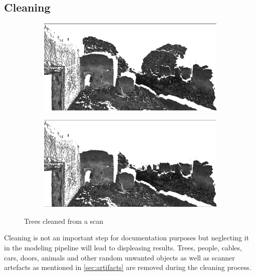 \subsection{Cleaning}

\begin{figure}[ht]
	\begin{subfigure}[b]{.45\textwidth}
	  \centering
	  \includegraphics[width=.9\linewidth]{images/dirty}
	\end{subfigure}%
	\begin{subfigure}[b]{.45\textwidth}
	  \centering
	  \includegraphics[width=.9\linewidth]{images/clean}
	\end{subfigure}
  \caption{Trees cleaned from a scan}
  \label{fig:cleaning}
\end{figure}

Cleaning is not an important step for documentation purposes but neglecting it in the modeling pipeline will lead to displeasing results. Trees, people, cables, cars, doors, animals and other random unwanted objects as well as scanner artefacts as mentioned in \autoref{sec:artifacts} are removed during the cleaning process. 




